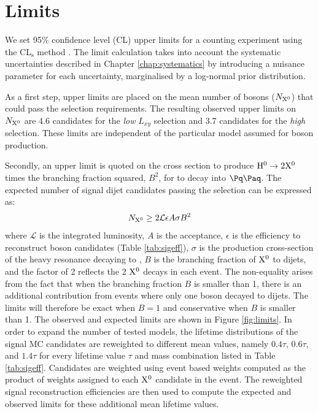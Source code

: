 \section{Limits}
\label{sec:limits}

We set 95\% confidence level
(CL) upper limits for a counting experiment
using the CL$_\mathrm{s}$ method \cite{Read:2002hq, Junk:1999kv}. The limit calculation
takes into account the systematic uncertainties described in Chapter 
\ref{chap:systematics} by introducing
a nuisance parameter for each uncertainty, marginalised by a log-normal prior distribution.

As a first step, upper limits are placed on the mean number of \X bosons ($N_\mathrm{X^{0}}$) that could pass
the selection requirements. The resulting observed upper limits on $N_\mathrm{X^{0}}$ are 4.6 candidates
for the {\it low} $L_{xy}$ selection and 3.7 candidates for the {\it high} selection.
 These limits are independent
of the particular model assumed for \X boson production.


Secondly, an upper limit is quoted on the cross section
to produce $\mathrm{H}^{0} \to 2\mathrm{X^{0}}$ times the branching fraction squared, $B^2$, for \X to decay into $\qq$.
The expected number of signal dijet candidates passing the selection can be expressed as:
\begin{equation}
N_\mathrm{X^{0}} \geq 2 \mathcal{L}\epsilon A\sigma B^2
\end{equation}
where $\mathcal{L}$ is the integrated luminosity, $A$ is the acceptance,
$\epsilon$ is the efficiency to reconstruct \X boson candidates
(Table \ref{tab:sigeff}), $\sigma$ is the production cross-section of the heavy resonance decaying to \X,
$B$ is the branching fraction of $\mathrm{X^{0}}$ to dijets, and the factor of 2 reflects the 2 $\mathrm{X^{0}}$ decays in each event.
 The non-equality arises from the fact that when the branching
fraction $B$
is smaller than 1, there is an additional contribution from events where only one \X boson decayed to dijets.
The limits will therefore be exact when $B=1$ and conservative when $B$ is smaller than 1.
The observed and
expected limits are shown in Figure \ref{fig:limits}. In order to expand the number of tested models,
the lifetime distributions of the signal MC candidates are reweighted to
different mean values, namely $0.4\tau$, $0.6\tau$, and $1.4\tau$ for every
lifetime value $\tau$ and mass combination listed
in Table \ref{tab:sigeff}.
Candidates are weighted using event based weights computed as the product
 of weights assigned to each $\mathrm{X^{0}}$ candidate in the event.
The reweighted signal reconstruction efficiencies are then used
to compute the expected and observed limits for these additional mean lifetime values.


